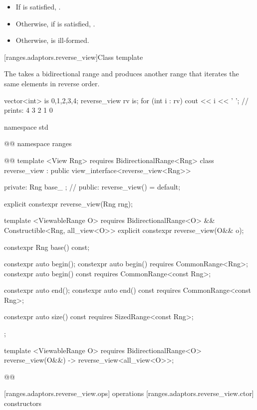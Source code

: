\begin{itemize}
\item If 
is satisfied, .
\item Otherwise, if  is satisfied,
.
\item Otherwise,  is ill-formed.
\end{itemize}

[ranges.adaptors.reverse_view]{Class template }

\pnum
The  takes a bidirectional range and produces another range
that iterates the same elements in reverse order.

\pnum
\enterexample
\begin{codeblock}
vector<int> is {0,1,2,3,4};
reverse_view rv {is};
for (int i : rv)
  cout << i << ' '; // prints: 4 3 2 1 0
\end{codeblock}
\exitexample

\begin{codeblock}
namespace std { @@ namespace ranges { @@
  template <View Rng>
    requires BidirectionalRange<Rng>
  class reverse_view : public view_interface<reverse_view<Rng>> {
  private:
    Rng base_ {}; // \expos
  public:
    reverse_view() = default;

    explicit constexpr reverse_view(Rng rng);

    template <ViewableRange O>
      requires BidirectionalRange<O> && Constructible<Rng, all_view<O>>
    explicit constexpr reverse_view(O&& o);

    constexpr Rng base() const;

    constexpr auto begin();
    constexpr auto begin() requires CommonRange<Rng>;
    constexpr auto begin() const requires CommonRange<const Rng>;

    constexpr auto end();
    constexpr auto end() const requires CommonRange<const Rng>;

    constexpr auto size() const requires SizedRange<const Rng>;
  };

  template <ViewableRange O>
    requires BidirectionalRange<O>
  reverse_view(O&&) -> reverse_view<all_view<O>>;
}}@\removed{\}\}}@
\end{codeblock}

[ranges.adaptors.reverse_view.ops]{ operations}
[ranges.adaptors.reverse_view.ctor]{ constructors}

